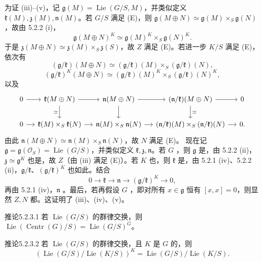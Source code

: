 为证 (iii)--(v)，记 $\mathfrak g(M)=\operatorname{Lie}(G/S,M)$，并类似定义 $\mathfrak k(M),\mathfrak z(M),\mathfrak n(M)$。若 $G/S$ 满足 (E)，则 $\mathfrak g(M\oplus N)\simeq\mathfrak g(M)\times_S\mathfrak g(N)$，故由 5.2.2 (i)，
\[\mathfrak g(M\oplus N)^K\simeq\mathfrak g(M)^K\times_S\mathfrak g(N)^K.\]
于是 $\mathfrak z(M\oplus N)\simeq\mathfrak z(M)\times_S\mathfrak z(S)$，故 $Z$ 满足 (E)。若进一步 $K/S$ 满足 (E)，依次有
\[(\mathfrak g/\mathfrak k)(M\oplus N)\simeq(\mathfrak g/\mathfrak k)(M)\times_S(\mathfrak g/\mathfrak k)(N),\]
\[(\mathfrak g/\mathfrak k)^K(M\oplus N)\simeq(\mathfrak g/\mathfrak k)(M)^K\times_S(\mathfrak g/\mathfrak k)(N)^K,\]
以及
\[\begin{tikzcd}[column sep=small]
0\arrow[r]&\mathfrak k(M\oplus N)\arrow[r]\arrow[d,"\simeq"']&\mathfrak n(M\oplus N)\arrow[r]\arrow[d]&(\mathfrak n/\mathfrak k)(M\oplus N)\arrow[r]\arrow[d,"\simeq"]&0\\
0\arrow[r]&\mathfrak k(M)\times_S\mathfrak k(N)\arrow[r]&\mathfrak n(M)\times_S\mathfrak n(N)\arrow[r]&(\mathfrak n/\mathfrak k)(M)\times_S(\mathfrak n/\mathfrak k)(N)\arrow[r]&0.
\end{tikzcd}\]
由此 $\mathfrak n(M\oplus N)\simeq\mathfrak n(M)\times_S\mathfrak n(N)$，故 $N$ 满足 (E)。
现在记 $\mathfrak g=\mathfrak g(\mathcal O_S)=\operatorname{Lie}(G/S)$，并类似定义 $\mathfrak k,\mathfrak z,\mathfrak n$。若 $G$ ，则 $\mathfrak g$ 是，由 5.2.2 (ii)，$\mathfrak z\simeq\mathfrak g^K$ 也是，故 $Z$（由 (iii) 满足 (E)）。若 $K$ 也，则 $\mathfrak k$ 是，由 5.2.1 (iv)、5.2.2 (ii)，$\mathfrak g/\mathfrak k$、$(\mathfrak g/\mathfrak k)^K$ 也如此。结合
\[0\to\mathfrak k\to\mathfrak n\to(\mathfrak g/\mathfrak k)^K\to0,\]
再由 5.2.1 (iv)，$\mathfrak n$ 。最后，若再假设 $G$ ，即对所有 $x\in\mathfrak g$ 恒有 $[x,x]=0$，则显然 $Z,N$ 都。这证明了 (iii)、(iv)、(v)。
\begin{SGAresult}{推论}{5.2.3.1}
若 $\operatorname{Lie}(G/S)$ 的群律交换，则 $\operatorname{Lie}(\operatorname{Centr}(G)/S)=\operatorname{Lie}(G/S)^G$。
\end{SGAresult}
\begin{SGAresult}{推论}{5.2.3.2}
若 $\operatorname{Lie}(G/S)$ 的群律交换，且 $K$ 是 $G$ 的，则
\[(\operatorname{Lie}(G/S)/\operatorname{Lie}(K/S))^K=\operatorname{Lie}(G/S)/\operatorname{Lie}(K/S).\]
\end{SGAresult}

